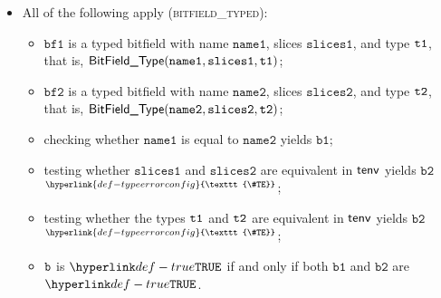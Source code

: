 \documentclass{book}
\newcommand\TypeErrorConfig[0]{\hyperlink{def-typeerrorconfig}{\texttt{\#TE}}}
\newcommand\ProseOrTypeError[0]{\hyperlink{def-proseortypeerror}{$^{\TypeErrorConfig}$}}
\newcommand\bfone[0]{\texttt{bf1}}
\newcommand\bftwo[0]{\texttt{bf2}}
\newcommand\vbone[0]{\texttt{b1}}
\newcommand\vbtwo[0]{\texttt{b2}}
\newcommand\nameone[0]{\texttt{name1}}
\newcommand\nametwo[0]{\texttt{name2}}
\newcommand\slicesone[0]{\texttt{slices1}}
\newcommand\slicestwo[0]{\texttt{slices2}}
\begin{document}
\begin{itemize}
  \item All of the following apply (\textsc{bitfield\_typed}):
  \begin{itemize}
    \item $\bfone$ is a typed bitfield with name $\nameone$, slices $\slicesone$, and type $\texttt{t1}$, that is,
          $\BitFieldType(\nameone, \slicesone, \vtone)$;
    \item $\bftwo$ is a typed bitfield with name $\nametwo$, slices $\slicestwo$, and type $\texttt{t2}$, that is,
          $\BitFieldType(\nametwo, \slicestwo, \vttwo)$;
    \item checking whether $\nameone$ is equal to $\nametwo$ yields $\vbone$;
    \item testing whether $\slicesone$ and $\slicestwo$ are equivalent in $\textsf{tenv}$ yields $\vbtwo$ \ProseOrTypeError;
    \item testing whether the types $\texttt{t1}$ and $\texttt{t2}$ are equivalent in $\textsf{tenv}$ yields $\vbtwo$ \ProseOrTypeError;
    \item $\texttt{b}$ is $\True$ if and only if both $\vbone$ and $\vbtwo$ are $\True$.
  \end{itemize}
\end{itemize}
\end{document}
